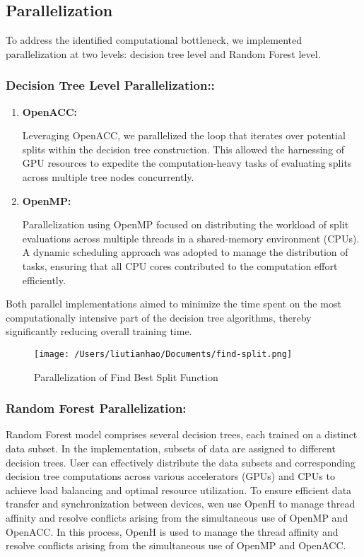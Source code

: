 \documentclass[11.5pt]{article}
\begin{document}
\subsection{Parallelization}
To address the identified computational bottleneck, we implemented parallelization at two levels: decision tree level and Random Forest level.


\subsubsection{Decision Tree Level Parallelization::} 
    \begin{enumerate}
        \item \textbf{OpenACC:}
        
        Leveraging OpenACC, we parallelized the loop that iterates over potential splits within the decision tree construction. This allowed the harnessing of GPU resources to expedite the computation-heavy tasks of evaluating splits across multiple tree nodes concurrently.

        \item \textbf{OpenMP:}
        
        Parallelization using OpenMP focused on distributing the workload of split evaluations across multiple threads in a shared-memory environment (CPUs). A dynamic scheduling approach was adopted to manage the distribution of tasks, ensuring that all CPU cores contributed to the computation effort efficiently.
    \end{enumerate}
Both parallel implementations aimed to minimize the time spent on the most computationally intensive part of the decision tree algorithms, thereby significantly reducing overall training time.
    
\begin{figure}[ht]
    \centering
    \texttt{[image: /Users/liutianhao/Documents/find-split.png]}
    \caption{Parallelization of Find Best Split Function}
    \label{fig:parallelization}
\end{figure}


\subsubsection{Random Forest Parallelization:} 
    
Random Forest model comprises several decision trees, each trained on a distinct data subset. In the implementation, subsets of data are assigned to different decision trees.
User can effectively distribute the data subsets and corresponding decision tree computations across various accelerators (GPUs) and CPUs to achieve load balancing and optimal resource utilization.
To ensure efficient data transfer and synchronization between devices, wen use OpenH to manage thread affinity and resolve conflicts arising from the simultaneous use of OpenMP and OpenACC. 
In this process, OpenH is used to manage the thread affinity and resolve conflicts arising from the simultaneous use of OpenMP and OpenACC.
\end{document}
